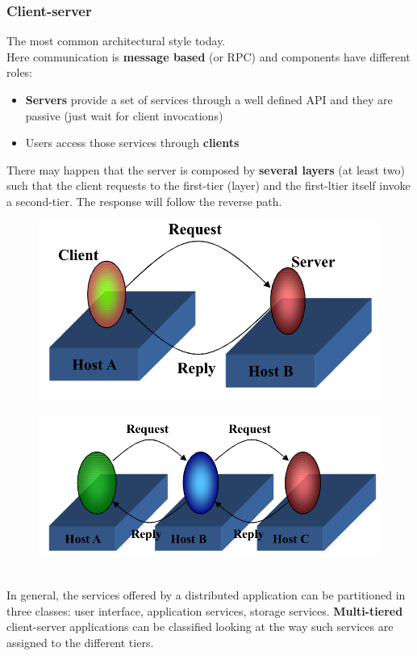 \documentclass[10pt,a4paper]{article}
\begin{document}
\subsubsection{Client-server}
The most common architectural style today. \\ Here communication is \textbf{message based} (or RPC) and  components have different roles:
\begin{itemize}
	\item \textbf{Servers} provide a set of services through a well defined API and they are passive (just wait for client invocations)
	\item Users access those services through \textbf{clients}
\end{itemize}
There may happen that the server is composed by \textbf{several layers} (at least two) such that the client requests to the first-tier (layer) and the first-ltier itself invoke a second-tier. The response will follow the reverse path. 
\begin{figure}[h!]
\centering
\begin{minipage}{.5\textwidth}
  \centering
  \includegraphics[width=.6\linewidth]{images/single-tier.png}
  \label{fig:single-tier}
\end{minipage}%
\begin{minipage}{.5\textwidth}
  \centering
  \includegraphics[width=.5\linewidth]{images/multi-tier.png}
  \label{fig:multi-tier}
\end{minipage}
\end{figure} 
\\ In general, the services offered by a distributed application can be partitioned in three classes: user interface, application services, storage services. \textbf{Multi-tiered} client-server applications can be classified looking at the way such services are assigned to the different tiers.
\end{document}
